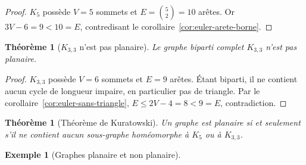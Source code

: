 \documentclass[12pt,a4paper,openany]{book}
\theoremstyle{definition}
\newtheorem{exemple}[definition]{Exemple}
\theoremstyle{plain}
\newtheorem{theoreme}[definition]{Théorème}
\theoremstyle{remark}
\begin{document}
\begin{proof}
$K_5$ possède $V = 5$ sommets et $E = \binom{5}{2} = 10$ arêtes. Or
$3V - 6 = 9 < 10 = E$, contredisant le corollaire~\ref{cor:euler-arete-borne}.
\end{proof}

\begin{theoreme}[$K_{3,3}$ n'est pas planaire]
\label{thm:K33-non-planaire}
Le graphe biparti complet $K_{3,3}$ n'est pas planaire.
\end{theoreme}

\begin{proof}
$K_{3,3}$ possède $V = 6$ sommets et $E = 9$ arêtes. Étant biparti, il
ne contient aucun cycle de longueur impaire, en particulier pas de
triangle. Par le corollaire~\ref{cor:euler-sans-triangle},
$E \leq 2V - 4 = 8 < 9 = E$, contradiction.
\end{proof}

\begin{theoreme}[Théorème de Kuratowski]
\label{thm:kuratowski}
Un graphe est planaire si et seulement s'il ne contient aucun sous-graphe
homéomorphe à $K_5$ ou à $K_{3,3}$.
\end{theoreme}

\begin{exemple}[Graphes planaire et non planaire]
\label{ex:planaire}

\begin{center}
\end{center}
\end{exemple}
\end{document}
